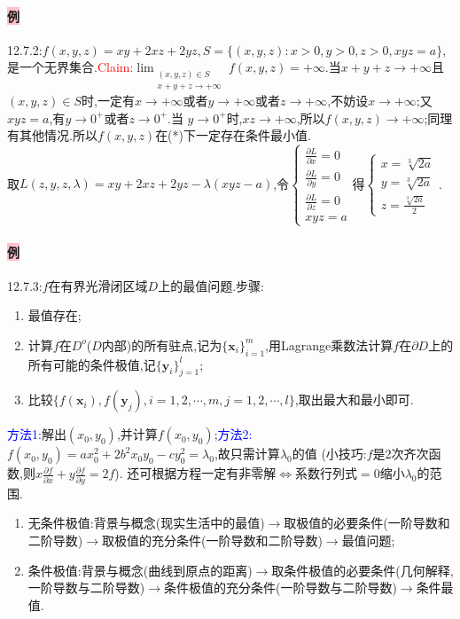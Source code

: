 \documentclass[UTF8]{ctexart}
\newcommand{\p}[2]{\frac{\partial #1}{\partial #2}}
\newcommand{\x}{\boldsymbol{x}}
\newcommand{\y}{\boldsymbol{y}}
\begin{document}
    \paragraph{\colorbox{pink}{例}}12.7.2:$f(x,y,z)=xy+2xz+2yz,S=\{(x,y,z):x>0,y>0,z>0,xyz=a\}$,是一个无界集合.\textcolor{red}{Claim:}$\lim_{\substack{(x,y,z)\in S\\ x+y+z\to+\infty}}f(x,y,z)=+\infty$.当$x+y+z\to+\infty$且$(x,y,z)\in S$时,一定有$x\to+\infty$或者$y\to+\infty$或者$z\to+\infty$,不妨设$x\to+\infty$;又$xyz=a$,有$y\to 0^+$或者$z\to0^+$.当
    $y\to 0^+$时,$xz\to+\infty$,所以$f(x,y,z)\to+\infty$;同理有其他情况.所以$f(x,y,z)$在(*)下一定存在条件最小值.\\
    取$L(z,y,z,\lambda)=xy+2xz+2yz-\lambda(xyz-a)$,令$\begin{cases}
        \p{L}{x}=0\\
        \p{L}{y}=0\\
        \p{L}{z}=0\\
        xyz=a
    \end{cases}$得$\begin{cases}
        x=\sqrt[3]{2a}\\
        y=\sqrt[3]{2a}\\
        z=\frac{\sqrt[3]{2a}}{2}
    \end{cases}$.

    \paragraph{\colorbox{pink}{例}}12.7.3:$f$在有界光滑闭区域$D$上的最值问题.步骤:
    \begin{enumerate}[{Step }1]
        \item 最值存在;
        \item 计算$f$在$D^o$($D$内部)的所有驻点,记为$\{\x_i\}_{i=1}^m$,用Lagrange乘数法计算$f$在$\partial D$上的所有可能的条件极值,记$\{\y_i\}_{j=1}^l$;
        \item 比较$\{f(\x_i),f(\y_j),i=1,2,\cdots,m,j=1,2,\cdots,l\}$,取出最大和最小即可.
    \end{enumerate}
    \textcolor{blue}{方法1:}解出$(x_0,y_0)$,并计算$f(x_0,y_0)$;\textcolor{blue}{方法2:}$f(x_0,y_0)=ax_0^2+2b^2x_0y_0-cy_0^2=\lambda_0$,故只需计算$\lambda_0$的值
    (小技巧:$f$是2次齐次函数,则$x\p{f}{x}+y\p{f}{y}=2f$).
    还可根据方程一定有非零解$\Leftrightarrow$系数行列式$=0$缩小$\lambda_0$的范围.

    \begin{tcolorbox}[colback=red!5!white,arc=1mm,colframe=red!75!black,fonttitle=\bfseries,title=总结:多元函数的极值理论]
    \begin{enumerate}[1)]
        \item 无条件极值:背景与概念(现实生活中的最值)$\rightarrow$取极值的必要条件(一阶导数和二阶导数)$\rightarrow$取极值的充分条件(一阶导数和二阶导数)$\rightarrow$最值问题;
        \item 条件极值:背景与概念(曲线到原点的距离)$\rightarrow$取条件极值的必要条件(几何解释,一阶导数与二阶导数)$\rightarrow$条件极值的充分条件(一阶导数与二阶导数)$\rightarrow$条件最值.
    \end{enumerate}
    \end{tcolorbox}
\end{document}
